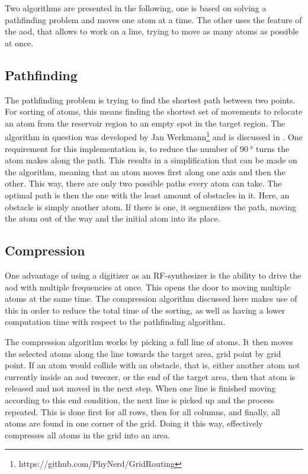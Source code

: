 Two algorithms are presented in the following, one is based on solving a pathfinding problem and moves one atom at a time. The other uses the feature of the \ac{aod}, that allows to work on a line, trying to move as many atoms as possible at once.


\subsection{Pathfinding}

The pathfinding problem is trying to find the shortest path between two points. For sorting of atoms, this means finding the shortest set of movements to relocate an atom from the reservoir region to an empty spot in the target region.
The algorithm in question was developed by Jan Werkmann\footnote{https://github.com/PhyNerd/GridRouting}  and is discussed in \cite{OhldeMello2020}. One requirement for this implementation is, to reduce the number of $\SI{90}{\degree}$ turns the atom makes along the path. This results in a simplification that can be made on the algorithm, meaning that an atom moves first along one axis and then the other. This way, there are only two possible paths every atom can take. The optimal path is then the one with the least amount of obstacles in it. Here, an obstacle is simply another atom. If there is one, it segmentizes the path, moving the atom out of the way and the initial atom into its place.

\subsection{Compression}
\label{sec:compression}

One advantage of using a digitizer as an RF-synthesizer is the ability to drive the \ac{aod} with multiple frequencies at once. This opens the door to moving multiple atoms at the same time. The compression algorithm discussed here makes use of this in order to reduce the total time of the sorting, as well as having a lower computation time with respect to the pathfinding algorithm.

The compression algorithm works by picking a full line of atoms. It then moves the selected atoms along the line towards the target area, grid point by grid point. If an atom would collide with an obstacle, that is, either another atom not currently inside an \ac{aod} tweezer, or the end of the target area, then that atom is released and not moved in the next step. When one line is finished moving according to this end condition, the next line is picked up and the process repeated. This is done first for all rows, then for all columns, and finally, all atoms are found in one corner of the grid. Doing it this way, effectively compresses all atoms in the grid into an area.

